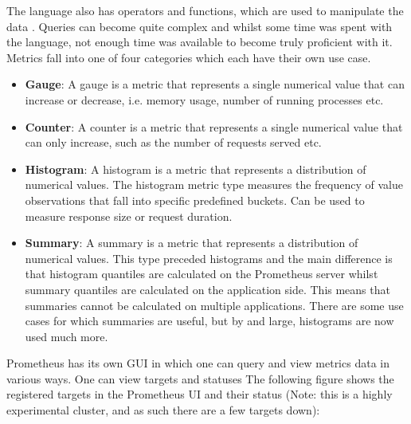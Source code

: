 The language also has operators and functions, which are used to manipulate the data \autocite{prometheusQueryFunctionsPrometheus}. Queries can become quite complex
and whilst some time was spent with the language, not enough time was available to become truly proficient with it. \\
Metrics fall into one of four categories which each have their own use case.
\begin{itemize}
	\item \textbf{Gauge}: A gauge is a metric that represents a single numerical value that can increase or decrease, i.e. memory usage, number of running processes etc.
	\item \textbf{Counter}: A counter is a metric that represents a single numerical value that can only increase, such as the number of requests served etc.
	\item \textbf{Histogram}: A histogram is a metric that represents a distribution of numerical values. The histogram metric type measures the frequency
	      of value observations that fall into specific predefined buckets\autocite{gregoryTypesPrometheusMetrics2019}. Can be used to measure response size or request
	      duration.
	\item \textbf{Summary}: A summary is a metric that represents a distribution of numerical values. This type preceded histograms and the main difference
	      is that histogram quantiles are calculated on the Prometheus server whilst summary quantiles are calculated on the application side. This means that
	      summaries cannot be calculated on multiple applications. There are some use cases for which summaries are useful, but by and large, histograms are
	      now used much more.
\end{itemize}
Prometheus has its own GUI in which one can query and view metrics data in various ways. One can view targets and statuses The following figure shows the
registered targets in the Prometheus UI and their status (Note: this is a highly experimental cluster, and as such there are a few targets down):
